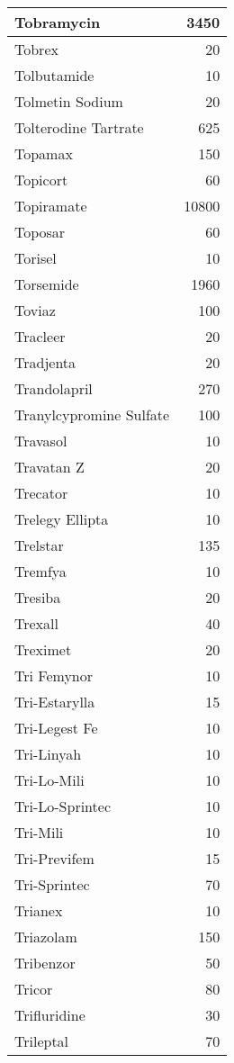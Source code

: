 \documentclass[
]{article}
\begin{document}
\begin{table}
\begin{tabular}[t]{l|r}
\hline
Tobramycin & 3450\\
\hline
Tobrex & 20\\
\hline
Tolbutamide & 10\\
\hline
Tolmetin Sodium & 20\\
\hline
Tolterodine Tartrate & 625\\
\hline
Topamax & 150\\
\hline
Topicort & 60\\
\hline
Topiramate & 10800\\
\hline
Toposar & 60\\
\hline
Torisel & 10\\
\hline
Torsemide & 1960\\
\hline
Toviaz & 100\\
\hline
Tracleer & 20\\
\hline
Tradjenta & 20\\
\hline
Trandolapril & 270\\
\hline
Tranylcypromine Sulfate & 100\\
\hline
Travasol & 10\\
\hline
Travatan Z & 20\\
\hline
Trecator & 10\\
\hline
Trelegy Ellipta & 10\\
\hline
Trelstar & 135\\
\hline
Tremfya & 10\\
\hline
Tresiba & 20\\
\hline
Trexall & 40\\
\hline
Treximet & 20\\
\hline
Tri Femynor & 10\\
\hline
Tri-Estarylla & 15\\
\hline
Tri-Legest Fe & 10\\
\hline
Tri-Linyah & 10\\
\hline
Tri-Lo-Mili & 10\\
\hline
Tri-Lo-Sprintec & 10\\
\hline
Tri-Mili & 10\\
\hline
Tri-Previfem & 15\\
\hline
Tri-Sprintec & 70\\
\hline
Trianex & 10\\
\hline
Triazolam & 150\\
\hline
Tribenzor & 50\\
\hline
Tricor & 80\\
\hline
Trifluridine & 30\\
\hline
Trileptal & 70\\

\end{tabular}
\end{table}
\end{document}
